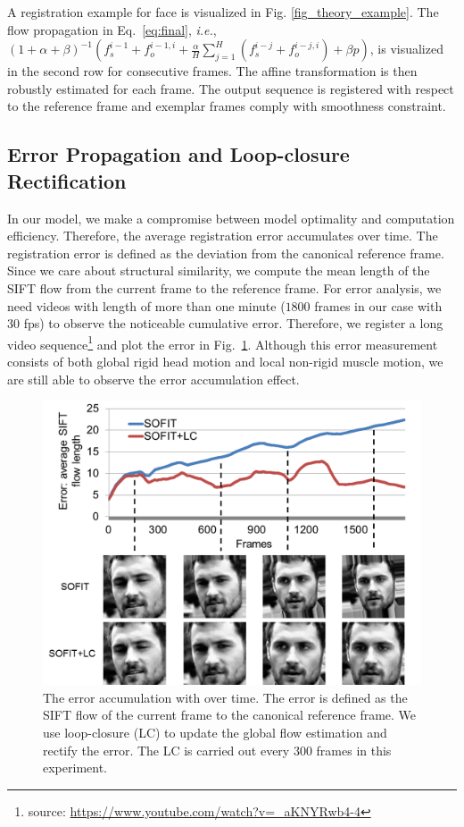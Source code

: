 \documentclass[10pt,journal]{IEEEtran}
\begin{document}
A registration example for face is visualized in Fig. \ref{fig_theory_example}. The flow propagation in Eq.~\eqref{eq:final}, \textit{i.e.}, $(1+\alpha+\beta)^{-1}(f_s^{i-1}+f_o^{i-1,i}+\frac{\alpha}{H}\sum_{j=1}^H(f_s^{i-j}+f_o^{i-j,i})+\beta{p})$, is visualized in the second row for consecutive frames. The affine transformation is then robustly estimated for each frame. The output sequence is registered with respect to the reference frame and exemplar frames comply with smoothness constraint. 


\subsection{\label{sec:details}Error Propagation and Loop-closure Rectification}

In our model, we make a compromise between model optimality and computation efficiency. Therefore, the average registration error accumulates over time. The registration error is defined as the deviation from the canonical reference frame. Since we care about structural similarity, we compute the mean length of the SIFT flow from the current frame to the reference frame. For error analysis, we need videos with length of more than one minute ($1800$ frames in our case with $30$ fps) to observe the noticeable cumulative error. Therefore, we register a long video sequence\footnote{source: \url{https://www.youtube.com/watch?v=_aKNYRwb4-4}} and plot the error in Fig.~\ref{fig_error_prop}. Although this error measurement consists of both global rigid head motion and local non-rigid muscle motion, we are still able to observe the error accumulation effect.

\begin{figure}[htbp]
	\centering
		\includegraphics[width=\columnwidth]{fig/error_prop.png}
	\caption{The error accumulation with over time. The error is defined as the SIFT flow of the current frame to the canonical reference frame. We use loop-closure (LC) to update the global flow estimation and rectify the error. The LC is carried out every $300$ frames in this experiment.}
	\label{fig_error_prop}
\end{figure}
\end{document}
